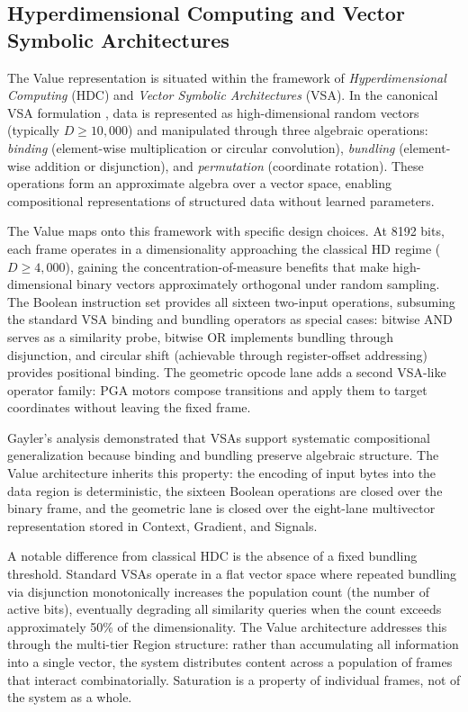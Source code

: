 \subsection{Hyperdimensional Computing and Vector Symbolic Architectures}
\label{sec:related_hdc_vsa}

The Value representation is situated within the framework of
\emph{Hyperdimensional Computing} (HDC) and \emph{Vector Symbolic
Architectures} (VSA).  In the canonical VSA formulation
\citep{kanerva2009hyperdimensional}, data is represented as
high-dimensional random vectors (typically $D \ge 10{,}000$) and
manipulated through three algebraic operations: \emph{binding}
(element-wise multiplication or circular convolution), \emph{bundling}
(element-wise addition or disjunction), and \emph{permutation}
(coordinate rotation).  These operations form an approximate algebra
over a vector space, enabling compositional representations of
structured data without learned parameters.

The Value maps onto this framework with specific design choices.  At
8192 bits, each frame operates in a dimensionality approaching the
classical HD regime ($D \ge 4{,}000$), gaining the
concentration-of-measure benefits that make high-dimensional binary
vectors approximately orthogonal under random sampling.  The Boolean
instruction set provides all sixteen two-input operations, subsuming the
standard VSA binding and bundling operators as special cases: bitwise AND
serves as a similarity probe, bitwise OR implements bundling through
disjunction, and circular shift (achievable through register-offset
addressing) provides positional binding.  The geometric opcode lane adds
a second VSA-like operator family: PGA motors compose transitions and
apply them to target coordinates without leaving the fixed frame.

Gayler's analysis \citep{gayler2003vector} demonstrated that VSAs
support systematic compositional generalization because binding and
bundling preserve algebraic structure.  The Value architecture inherits
this property: the encoding of input bytes into the data region is
deterministic, the sixteen Boolean operations are closed over the binary
frame, and the geometric lane is closed over the eight-lane multivector
representation stored in Context, Gradient, and Signals.

A notable difference from classical HDC is the absence of a fixed
bundling threshold.  Standard VSAs operate in a flat vector space where
repeated bundling via disjunction monotonically increases the population
count (the number of active bits), eventually degrading all similarity
queries when the count exceeds approximately 50\% of the dimensionality.
The Value architecture addresses this through the multi-tier Region
structure: rather than accumulating all information into a single vector,
the system distributes content across a population of frames that
interact combinatorially.  Saturation is a property of individual frames,
not of the system as a whole.
